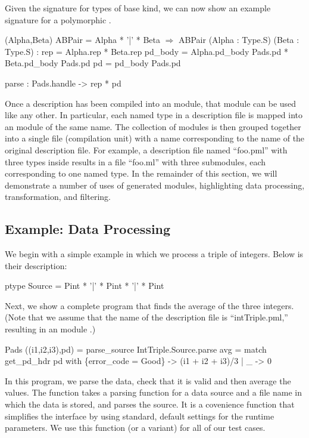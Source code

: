 Given the signature  for types of base kind, we can now
show an example signature for a polymorphic .
\begin{code}\scriptsize
{} (Alpha,Beta) ABPair = Alpha * '|' * Beta
\(\Longrightarrow\)
 ABPair (Alpha : Type.S) (Beta : Type.S) :
   rep = Alpha.rep * Beta.rep
   pd\_body = Alpha.pd\_body Pads.pd * 
                     Beta.pd\_body Pads.pd
   pd = pd\_body Pads.pd

   parse : Pads.handle -> rep * pd
\end{code}

Once a description has been compiled into an \ocaml{} module, that
module can be used like any other.  In particular, each named type in
a description file is mapped into an \ocaml module of the same name.
The collection of modules is then grouped together into a single file
(compilation unit) with a name corresponding to the name of the
original description file. For example, a description file named
``foo.pml'' with three types inside results in a file ``foo.ml'' with
three submodules, each corresponding to one named type.  In the
remainder of this section, we will demonstrate a number of uses of
generated modules, highlighting data processing, transformation, and
filtering.

\subsection{Example: Data Processing}
\label{sec:ex-process}

We begin with a simple example in which we process a triple of
integers. Below is their description:
\begin{code}\scriptsize
  ptype Source = Pint * '|' * Pint * '|' * Pint\end{code} Next, we
show a complete \ocaml{} program that finds the average of the three
integers. (Note that we assume that the name of the description file
is ``intTriple.pml,'' resulting in an \ocaml{} module .)
\begin{code}\scriptsize
{} Pads
 ((i1,i2,i3),pd) = parse_source IntTriple.Source.parse
 avg = match get_pd_hdr pd with
    \{error_code = Good\} -> (i1 + i2 + i3)/3
  | _ -> 0\end{code}

In this program, we parse the data, check that it is valid and then
average the values. The function  takes a parsing
function for a data source and a file name in which the data is
stored, and parses the source. It is a covenience function that
simplifies the \padsml{} interface by using standard, default settings
for the runtime parameters. We use this function (or a variant) for
all of our test cases. 

